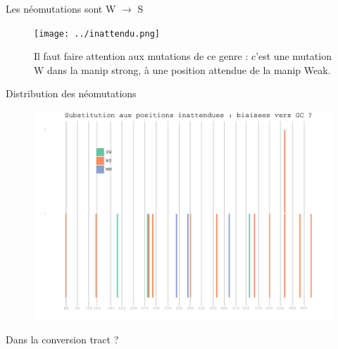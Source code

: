 \documentclass[xcolor=dvipsnames]{beamer}
\begin{document}
\begin{frame}{Les néomutations sont W $\rightarrow$ S}
  \begin{center}
    
  \end{center}

  \begin{figure}
    \texttt{[image: ../inattendu.png]}
    \caption*{Il faut faire attention aux mutations de ce genre : c'est une
      mutation W dans la manip strong, à une position attendue de la manip Weak.}
  \end{figure}
\end{frame}

\begin{frame}{Distribution des néomutations}
  \begin{figure}[htbp]
    \centering
    \includegraphics[width=0.8\linewidth]{../bgc_en_action.pdf}
  \end{figure}
\end{frame}

\begin{frame}{Dans la conversion tract ?}
  \begin{center}
  
  \end{center}
\end{frame}
\end{document}
